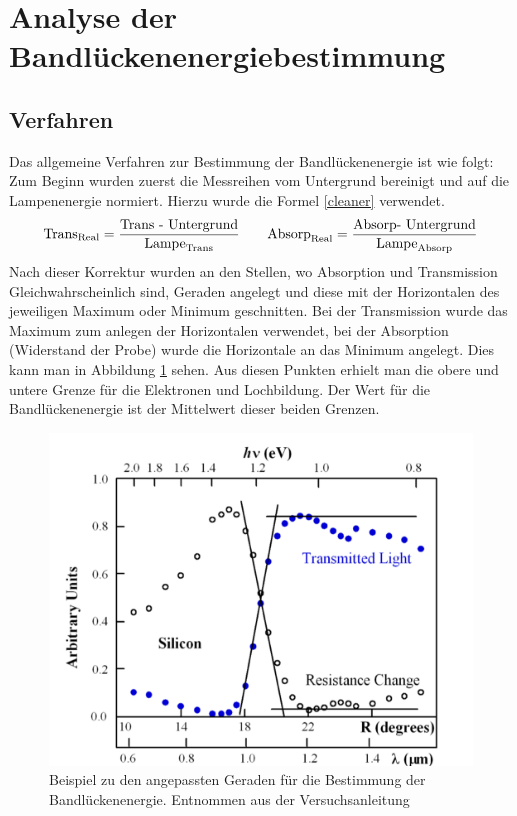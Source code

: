 \section{Analyse der Bandlückenenergiebestimmung}
\subsection{Verfahren}
Das allgemeine Verfahren zur Bestimmung der Bandlückenenergie ist wie folgt:
Zum Beginn wurden zuerst die Messreihen vom Untergrund bereinigt und auf die Lampenenergie normiert. Hierzu wurde die Formel \ref{cleaner} verwendet. 
\begin{equation}
\label{cleaner}
\text{Trans}_{\text{Real}} = \frac{\text{\text{Trans }- \text{Untergrund}}}{\text{Lampe}_{\text{Trans}}} \qquad 
\text{Absorp}_{\text{Real}} = \frac{\text{\text{Absorp}- \text{Untergrund}}}{\text{Lampe}_{\text{Absorp}}}
\end{equation}
Nach dieser Korrektur wurden an den Stellen, wo Absorption und Transmission Gleichwahrscheinlich sind, Geraden angelegt und diese mit der Horizontalen des jeweiligen Maximum oder Minimum geschnitten. Bei der Transmission wurde das Maximum zum anlegen der Horizontalen verwendet, bei der Absorption (Widerstand der Probe) wurde die Horizontale an das Minimum angelegt. Dies kann man in Abbildung \ref{anleitung_fit} sehen. Aus diesen Punkten erhielt man die obere und untere Grenze für die Elektronen und Lochbildung. Der Wert für die Bandlückenenergie ist der Mittelwert dieser beiden Grenzen.
\begin{figure}[h]
	\centering

	\includegraphics[scale=0.7]{Bilder/bsp_fit}
	\caption[Referenz zur Geraden Anpassung]{\small Beispiel zu den angepassten Geraden für die Bestimmung der Bandlückenenergie. Entnommen aus der Versuchsanleitung \cite{anleitung}}
	\label{anleitung_fit}	
\end{figure}

